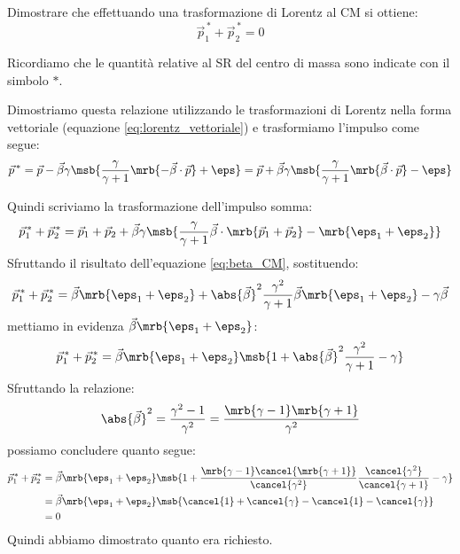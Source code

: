 \begin{example}[]
	Dimostrare che effettuando una trasformazione di Lorentz al CM si ottiene:
	\begin{equation}
		\vec{p}_1^{\,\ast} + \vec{p}_2^{\,\ast} = 0
	\end{equation}

	\begin{note}[]
		Ricordiamo che le quantità relative al SR del centro di massa sono indicate
		con il simbolo $\ast$.
	\end{note}

	Dimostriamo questa relazione utilizzando le trasformazioni di Lorentz nella
	forma vettoriale (equazione \ref{eq:lorentz_vettoriale}) e trasformiamo
	l'impulso come segue:
	\begin{equation}
		\vec{p}^{\,\ast} = \vec{p} - \vec{\beta}\gamma \msb{\frac{\gamma}{\gamma +
				1} \mrb{ -\vec{\beta} \cdot \vec{p}} + \eps} = \vec{p} + \vec{\beta}\gamma
		\msb{\frac{\gamma}{\gamma + 1} \mrb{\vec{\beta} \cdot \vec{p}} - \eps}
	\end{equation}

	Quindi scriviamo la trasformazione dell'impulso somma:
	\begin{equation}
		\vec{p}_1^{\,\ast} + \vec{p}_2^{\,\ast} = \vec{p}_1 + \vec{p}_2 +
		\vec{\beta}\gamma \msb{\frac{\gamma}{\gamma+1} \vec{\beta} \cdot
			\mrb{\vec{p}_1 + \vec{p}_2} - \mrb{\eps_1 + \eps_2}}
	\end{equation}
	Sfruttando il risultato dell'equazione \ref{eq:beta_CM}, sostituendo:
	\begin{equation}
		\vec{p}_1^{\,\ast} + \vec{p}_2^{\,\ast} = \vec{\beta} \mrb{\eps_1 +
			\eps_2} + \abs{\vec{\beta}}^2 \frac{\gamma^2}{\gamma + 1}
		\vec{\beta}\mrb{\eps_1 + \eps_2} - \gamma\vec{\beta}
	\end{equation}
	mettiamo in evidenza $\vec{\beta}\mrb{\eps_1 + \eps_2}$:
	\begin{equation}
		\vec{p}_1^{\,\ast} + \vec{p}_2^{\,\ast} = \vec{\beta}\mrb{\eps_1 +
			\eps_2} \msb{1 + \abs{\vec{\beta}}^2 \frac{\gamma^2}{\gamma + 1} -
			\gamma}
	\end{equation}
	Sfruttando la relazione:
	\begin{equation}
		\abs{\vec{\beta}}^2 = \frac{\gamma^2 - 1}{\gamma^2} = \frac{\mrb{\gamma -
				1} \mrb{\gamma + 1}}{\gamma^2}
	\end{equation}
	possiamo concludere quanto segue:
	\begin{align}
		\vec{p}_1^{\,\ast} + \vec{p}_2^{\,\ast}
		 & = \vec{\beta}\mrb{\eps_1 + \eps_2} \msb{1 + \frac{\mrb{\gamma - 1}
				\cancel{\mrb{\gamma + 1}}}{\cancel{\gamma^2}}
			\frac{\cancel{\gamma^2}}{\cancel{\gamma + 1}} - \gamma}
		\\\notag
		 & = \vec{\beta}\mrb{\eps_1 + \eps_2} \msb{\cancel{1} + \cancel{\gamma} -
			\cancel{1} - \cancel{\gamma}}
		\\\notag
		 & = 0
	\end{align}
	Quindi abbiamo dimostrato quanto era richiesto.
\end{example}

